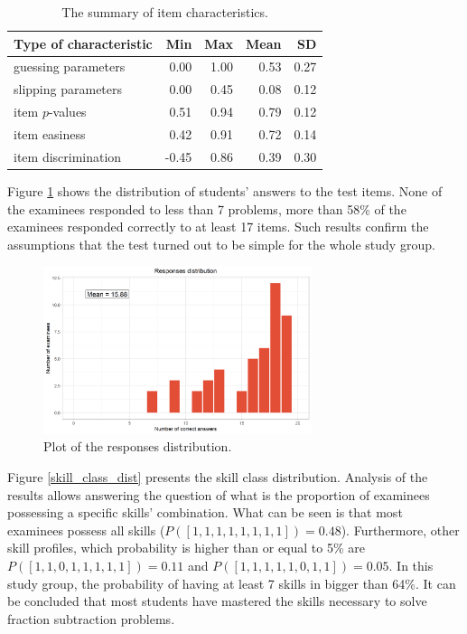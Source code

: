 \documentclass[english]{pwr_wmat_praca_dyplomowa}
\theoremstyle{plain}
\theoremstyle{definition}
\numberwithin{theorem}{chapter}
\begin{document}
\begin{table}[H]
	\centering
	\begin{tabular}{l r r r r } 
		\hline
		{\rule{0pt}{3ex}}Type of characteristic & Min & Max & Mean & SD \\
		\hline
		{\rule{0pt}{3ex}}guessing parameters & 0.00 & 1.00 & 0.53 & 0.27 \\
		slipping parameters & 0.00 & 0.45 & 0.08 & 0.12 \\ 
		item $p$-values & 0.51 & 0.94 & 0.79 & 0.12 \\ 
		item easiness & 0.42 & 0.91 & 0.72 & 0.14\\
		item discrimination & -0.45 & 0.86 & 0.39 & 0.30\\ [0.5ex] 
		\hline
	\end{tabular}
	\caption{The summary of item characteristics.}
	\label{tab:item_param} 
\end{table}

Figure \ref{histogram_ans} shows the distribution of students' answers to the test items. None of the examinees responded to less than 7 problems, more than 58\% of the examinees responded correctly to at least 17 items. Such results confirm the assumptions that the test turned out to be simple for the whole study group. 

\begin{figure}[h!]
	\centering
	\includegraphics[width=0.7\textwidth]{Responses_distribution.png}
	\caption{Plot of the responses distribution.}
	\label{histogram_ans}
\end{figure}

Figure \ref{skill_class_dist} presents the skill class distribution. Analysis of the results allows answering the question of what is the proportion of examinees possessing a specific skills' combination. What can be seen is that most examinees possess all skills ($P([1,1,1,1,1,1,1,1])=0.48$). Furthermore, other skill profiles, which probability is higher than or equal to 5\% are $P([1,1,0,1,1,1,1,1])=0.11$ and $P([1,1,1,1,1,0,1,1])=0.05$. In this study group, the probability of having at least 7 skills in bigger than 64\%. It can be concluded that most students have mastered the skills necessary to solve fraction subtraction problems.
\end{document}
